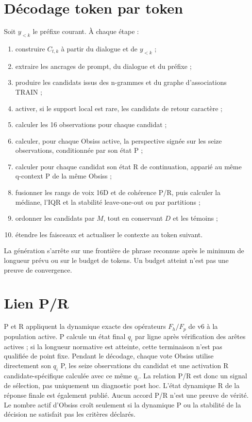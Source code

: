 \documentclass[11pt,a4paper]{report}
\begin{document}
\section{Décodage token par token}
Soit $y_{<k}$ le préfixe courant. À chaque étape :
\begin{enumerate}[nosep]
\item construire $C_{t,k}$ à partir du dialogue et de $y_{<k}$ ;
\item extraire les ancrages de prompt, du dialogue et du préfixe ;
\item produire les candidats issus des n-grammes et du graphe d'associations TRAIN ;
\item activer, si le support local est rare, les candidats de retour caractère ;
\item calculer les 16 observations pour chaque candidat ;
\item calculer, pour chaque Obsiss active, la perspective signée sur les seize observations, conditionnée par son état P ;
\item calculer pour chaque candidat son état R de continuation, apparié au même q-context P de la même Obsiss ;
\item fusionner les rangs de voix 16D et de cohérence P/R, puis calculer la médiane, l'IQR et la stabilité leave-one-out ou par partitions ;
\item ordonner les candidats par $M$, tout en conservant $D$ et les témoins ;
\item étendre les faisceaux et actualiser le contexte au token suivant.
\end{enumerate}
La génération s'arrête sur une frontière de phrase reconnue après le minimum de longueur prévu ou sur le budget de tokens. Un budget atteint n'est pas une preuve de convergence.

\section{Lien P/R}
P et R appliquent la dynamique exacte des opérateurs $F_h/F_p$ de v6 à la population active. P calcule un état final $q_i$ par ligne après vérification des arêtes actives ; si la longueur normative est atteinte, cette terminaison n'est pas qualifiée de point fixe. Pendant le décodage, chaque vote Obsiss utilise directement son $q_i$ P, les seize observations du candidat et une activation R candidate-spécifique calculée avec ce même $q_i$. La relation P/R est donc un signal de sélection, pas uniquement un diagnostic post hoc. L'état dynamique R de la réponse finale est également publié. Aucun accord P/R n'est une preuve de vérité. Le nombre actif d'Obsiss croît seulement si la dynamique P ou la stabilité de la décision ne satisfait pas les critères déclarés.
\end{document}
